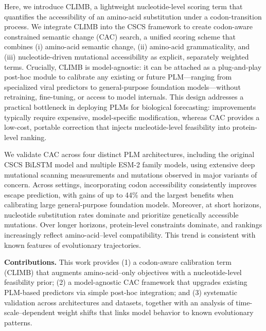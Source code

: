 \documentclass[pdflatex,sn-nature]{sn-jnl}
\begin{document}
Here, we introduce CLIMB, a lightweight nucleotide-level scoring term that quantifies the accessibility of an amino-acid substitution under a codon-transition process. We integrate CLIMB into the CSCS framework to create codon-aware constrained semantic change (CAC) search, a unified scoring scheme that combines (i) amino-acid semantic change, (ii) amino-acid grammaticality, and (iii) nucleotide-driven mutational accessibility as explicit, separately weighted terms. Crucially, CLIMB is model-agnostic: it can be attached as a plug-and-play post-hoc module to calibrate any existing or future PLM—ranging from specialized viral predictors to general-purpose foundation models—without retraining, fine-tuning, or access to model internals. This design addresses a practical bottleneck in deploying PLMs for biological forecasting: improvements typically require expensive, model-specific modification, whereas CAC provides a low-cost, portable correction that injects nucleotide-level feasibility into protein-level ranking.

We validate CAC across four distinct PLM architectures, including the original CSCS BiLSTM model and multiple ESM-2 family models, using extensive deep mutational scanning measurements and mutations observed in major variants of concern. Across settings, incorporating codon accessibility consistently improves escape prediction, with gains of up to 44\% and the largest benefits when calibrating large general-purpose foundation models. Moreover, at short horizons, nucleotide substitution rates dominate and prioritize genetically accessible mutations. Over longer horizons, protein-level constraints dominate, and rankings increasingly reflect amino-acid–level compatibility. This trend is consistent with known features of evolutionary trajectories.
\smallskip

\noindent\textbf{Contributions.} This work provides (1) a codon-aware calibration term (CLIMB) that augments amino-acid–only objectives with a nucleotide-level feasibility prior; (2) a model-agnostic CAC framework that upgrades existing PLM-based predictors via simple post-hoc integration; and (3) systematic validation across architectures and datasets, together with an analysis of time-scale–dependent weight shifts that links model behavior to known evolutionary patterns.
\end{document}
